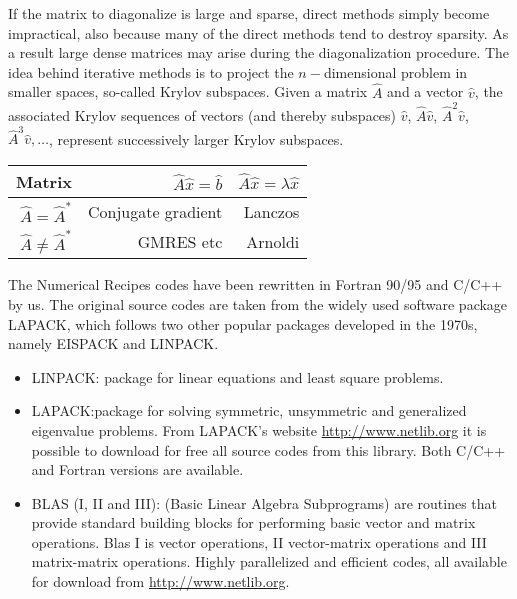 If the matrix to diagonalize is large and sparse, direct methods simply become impractical, 
also because
many of the direct methods tend to destroy sparsity. As a result large dense matrices may arise during the diagonalization procedure.  The idea behind iterative methods is to project the 
$n-$dimensional problem in smaller spaces, so-called Krylov subspaces. 
Given a matrix $\hat{A}$ and a vector $\hat{v}$, the associated Krylov sequences of vectors
(and thereby subspaces) 
$\hat{v}$, $\hat{A}\hat{v}$, $\hat{A}^2\hat{v}$, $\hat{A}^3\hat{v},\dots$, represent
successively larger Krylov subspaces.  \newline
\begin{center}
\begin{tabular}{rrr}\hline
Matrix&$\hat{A}\hat{x}=\hat{b}$&$\hat{A}\hat{x}=\lambda\hat{x}$ \\\hline
   $\hat{A}=\hat{A}^*$ & Conjugate gradient    &Lanczos      \\
  $\hat{A}\ne \hat{A}^*$  &GMRES etc    &Arnoldi      \\ \hline
\end{tabular}  
\end{center}


The Numerical Recipes codes have been rewritten in Fortran 90/95 and C/C++ by us.
The original source codes are taken from the widely used software
package LAPACK, which follows two other popular packages developed in the 1970s, 
namely EISPACK
and LINPACK.
\begin{itemize}
\item LINPACK: package for linear equations 
and least square problems.
\item LAPACK:package for solving symmetric, unsymmetric and generalized eigenvalue problems.
From LAPACK's website \url{http://www.netlib.org}  it is 
possible to download for free all source codes from 
this library. Both C/C++ and Fortran versions are available.
\item BLAS (I, II and III): (Basic Linear Algebra Subprograms) 
are routines that provide standard building blocks for performing basic vector and matrix operations.  
Blas I is vector operations, II vector-matrix operations and III matrix-matrix operations.
Highly parallelized and efficient codes, all available for download from 
\url{http://www.netlib.org}. 
\end{itemize}



